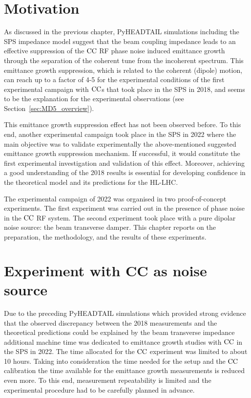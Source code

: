 \section{Motivation}\label{sec:motivation_md_2022}
As discussed in the previous chapter, PyHEADTAIL simulations including the SPS impedance model suggest that the beam coupling impedance leads to an effective suppression of the ${\mathrm{CC}}$ RF phase noise induced emittance growth through the separation of the coherent tune from the incoherent spectrum. This emittance growth suppression, which is related to the coherent (dipole) motion, can reach up to a factor of 4-5 for the experimental conditions of the first experimental campaign with ${\mathrm{CC}}$s that took place in the SPS in 2018, and seems to be the explanation for the experimental observations (see Section~\ref{sec:MD5_overview}).

This emittance growth suppression effect has not been observed before. To this end, another experimental campaign took place in the SPS in 2022 where the main objective was to validate experimentally the above-mentioned suggested emittance growth suppression mechanism. If successful, it would constitute the first experimental investigation and validation of this effect. Moreover, achieving a good understanding of the 2018 results is essential for developing confidence in the theoretical model and its predictions for the HL-LHC.

The experimental campaign of 2022 was organised in two proof-of-concept experiments. The first experiment was carried out in the presence of phase noise in the ${\mathrm{CC}}$ RF system. The second experiment took place with a pure dipolar noise source: the beam transverse damper. This chapter reports on the preparation, the methodology, and the results of these experiments.

\section{Experiment with CC as noise source}\label{sec:cc_md_2022}
Due to the preceding PyHEADTAIL simulations which provided strong evidence that the observed discrepancy between the 2018 measurements and the theoretical predictions could be explained by the beam transverse impedance additional machine time was dedicated to emittance growth studies with ${\mathrm{CC}}$ in the SPS in 2022. The time allocated for the ${\mathrm{CC}}$ experiment was limited to about 10 hours. Taking into consideration the time needed for the setup and the ${\mathrm{CC}}$ calibration the time available for the emittance growth measurements is reduced even more. To this end, measurement repeatability is limited and the experimental procedure had to be carefully planned in advance.

